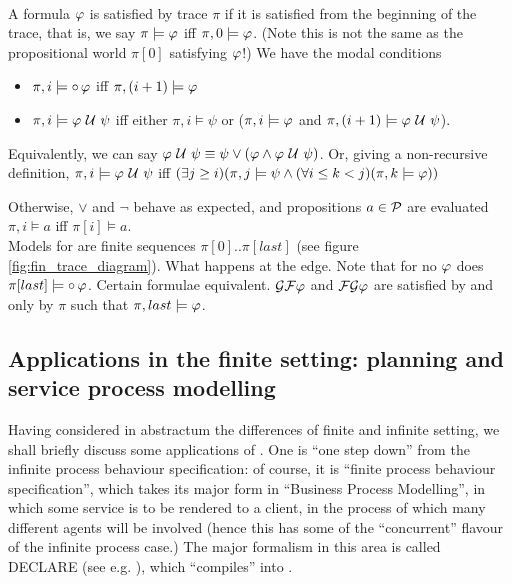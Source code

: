 \\A formula $\varphi$ is satisfied by trace $\pi$ if it is satisfied
from the beginning of the trace, that is,
we say $\pi \models \varphi$ iff $\pi, 0 \models \varphi$.
(Note this is not the same as the
propositional world $\pi[0]$ satisfying $\varphi$!)
We have the modal conditions
\\
\begin{itemize}
\item$\pi, i \models \circ\,\varphi$ iff $\pi, (i+1) \models\varphi$
\item $\pi, i \models \varphi\ \mathcal{U}\ \psi$ iff
either $\pi, i \models \psi$ or
($\pi, i \models \varphi$ and $\pi, (i+1) \models \varphi\ \mathcal{U}\ \psi$).
\end{itemize}
Equivalently, we can say $\varphi\ \mathcal{U}\ \psi \equiv
\psi \lor (\varphi \land \varphi\ \mathcal{U}\ \psi)$.
Or, giving a non-recursive definition,
$\pi, i \models \varphi \ \mathcal{U}\  \psi$ iff
$(\exists j \geq i)
(\pi,j \models \psi \land
(\forall i \leq k < j) (\pi, k \models \varphi))$

Otherwise, $\lor$ and $\neg$ behave as expected, and propositions $a \in \mathcal{P}$ are evaluated
$\pi,i \models a$ iff $\pi[i] \models a$.
\\Models for \ltlf are finite sequences $\pi[0]..\pi[last]$ (see figure \ref{fig:fin_trace_diagram}).
What happens at the edge.
Note that for no $\varphi$ does $\pi[last] \models \circ\,\varphi$.
Certain formulae equivalent. $\mathcal{G} \mathcal{F} \varphi$ and
$\mathcal{F} \mathcal{G} \varphi$ are satisfied by and only by $\pi$ such that $\pi, last \models \varphi$.


\subsection{Applications in the finite setting: planning and service process modelling}

Having considered in abstractum the differences of finite and infinite setting, we shall briefly discuss some applications of \ltlf.
One is ``one step down'' from the infinite process behaviour specification: of course, it is ``finite process behaviour specification'', which takes its major form in
``Business Process Modelling'', in which some service is to be rendered to a client, in the process of which many different agents will be involved
(hence this has some of the ``concurrent'' flavour of the infinite process case.)
The major formalism in this area is called DECLARE (see e.g. \cite{decserflow}), which ``compiles'' into \ltlf.

